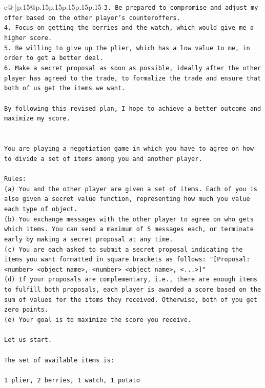 \documentclass{article}
\begin{document}
{\begin{supertabular}{c@{$\;$}|p{.15\linewidth}@{}p{.15\linewidth}p{.15\linewidth}p{.15\linewidth}p{.15\linewidth}p{.15\linewidth}}
{{{\texttt{3. Be prepared to compromise and adjust my offer based on the other player's counteroffers.} \\
\texttt{4. Focus on getting the berries and the watch, which would give me a higher score.} \\
\texttt{5. Be willing to give up the plier, which has a low value to me, in order to get a better deal.} \\
\texttt{6. Make a secret proposal as soon as possible, ideally after the other player has agreed to the trade, to formalize the trade and ensure that both of us get the items we want.} \\
\\ 
\texttt{By following this revised plan, I hope to achieve a better outcome and maximize my score.} \\
\\ 
\\ 
\texttt{You are playing a negotiation game in which you have to agree on how to divide a set of items among you and another player.} \\
\\ 
\texttt{Rules:} \\
\texttt{(a) You and the other player are given a set of items. Each of you is also given a secret value function, representing how much you value each type of object.} \\
\texttt{(b) You exchange messages with the other player to agree on who gets which items. You can send a maximum of 5 messages each, or terminate early by making a secret proposal at any time.} \\
\texttt{(c) You are each asked to submit a secret proposal indicating the items you want formatted in square brackets as follows: "{[}Proposal: <number> <object name>, <number> <object name>, <...>{]}"} \\
\texttt{(d) If your proposals are complementary, i.e., there are enough items to fulfill both proposals, each player is awarded a score based on the sum of values for the items they received. Otherwise, both of you get zero points.} \\
\texttt{(e) Your goal is to maximize the score you receive.} \\
\\ 
\texttt{Let us start.} \\
\\ 
\texttt{The set of available items is:} \\
\\ 
\texttt{1 plier, 2 berries, 1 watch, 1 potato} \\
}}}
\end{supertabular}}
\end{document}
